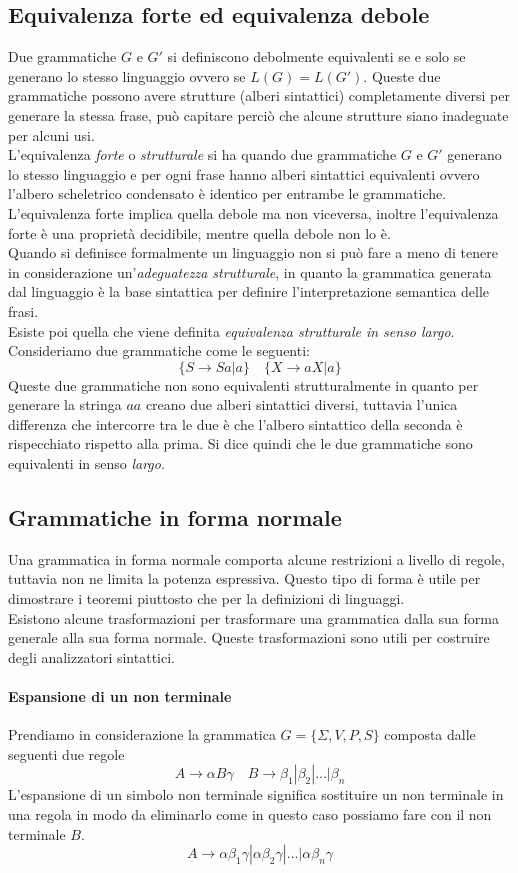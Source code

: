 \subsection{Equivalenza forte ed equivalenza debole}
Due grammatiche $ G $ e $ G' $ si definiscono debolmente equivalenti se e solo se generano lo stesso linguaggio ovvero se $ L(G) = L(G') $. Queste due grammatiche possono avere strutture (alberi sintattici) completamente diversi per generare la stessa frase, può capitare perciò che alcune strutture siano inadeguate per alcuni usi.\\
L'equivalenza \emph{forte} o \emph{strutturale} si ha quando due grammatiche $ G $ e $ G' $ generano lo stesso linguaggio e per ogni frase hanno alberi sintattici equivalenti ovvero l'albero scheletrico condensato è identico per entrambe le grammatiche. L'equivalenza forte implica quella debole ma non viceversa, inoltre l'equivalenza forte è una proprietà decidibile, mentre quella debole non lo è.\\
Quando si definisce formalmente un linguaggio non si può fare a meno di tenere in considerazione un'\emph{adeguatezza strutturale}, in quanto la grammatica generata dal linguaggio è la base sintattica per definire l'interpretazione semantica delle frasi.\\
Esiste poi quella che viene definita \emph{equivalenza strutturale in senso largo}. Consideriamo due grammatiche come le seguenti:
$$\{S\rightarrow Sa|a\} \quad \{X\rightarrow aX | a \} $$
Queste due grammatiche non sono equivalenti strutturalmente in quanto per generare la stringa $ aa $ creano due alberi sintattici diversi, tuttavia l'unica differenza che intercorre tra le due è che l'albero sintattico della seconda è rispecchiato rispetto alla prima. Si dice quindi che le due grammatiche sono equivalenti in senso \emph{largo}.
\subsection{Grammatiche in forma normale}
Una grammatica in forma normale comporta alcune restrizioni a livello di regole, tuttavia non ne limita la potenza espressiva. Questo tipo di forma è utile per dimostrare i teoremi piuttosto che per la definizioni di linguaggi.\\
Esistono alcune trasformazioni per trasformare una grammatica dalla sua forma generale alla sua forma normale. Queste trasformazioni sono utili per costruire degli analizzatori sintattici.
\paragraph{Espansione di un non terminale}
Prendiamo in considerazione la grammatica $ G = \{\Sigma,V,P,S \} $ composta dalle seguenti due regole
$$A\rightarrow \alpha B \gamma \quad B\rightarrow \beta_1|\beta_2|\dots|\beta_n$$
L'espansione di un simbolo non terminale significa sostituire un non terminale in una regola in modo da eliminarlo come in questo caso possiamo fare con il non terminale $ B $.
$$A\rightarrow \alpha\beta_1\gamma|\alpha\beta_2\gamma|\dots|\alpha\beta_n\gamma$$
